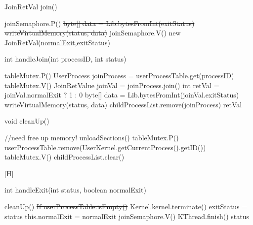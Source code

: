 \documentclass{article}
\begin{document}
\begin{spacing}{1.1}
\begin{algorithm}
  \label{alg:join}
  \caption{JoinRetVal \textsf{join}()}
  joinSemaphore.P()\;
  {\color{red}\sout{byte[] data = Lib.bytesFromInt(exitStatus)}\;
  \sout{writeVirtualMemory(status, data)}\;}
  joinSemaphore.V()\;
  {\color{red}\Return new JoinRetVal(normalExit,exitStatus)\;}
\end{algorithm}

\begin{algorithm}[H]
  \label{alg:handleJoin}
  \caption{int \textsf{handleJoin}(int processID, int status)}
  \colorbox{myyellow}{tableMutex.P()}\;
  UserProcess joinProcess = userProcessTable.get(processID)\;
  \colorbox{myyellow}{tableMutex.V()}\;
  {\color{red}
   {
  \;
   {
  \;
  }
  }
  JoinRetValue joinVal = joinProcess.join()\;
  int retVal = joinVal.normalExit ? 1 : 0\;
  byte[] data = Lib.bytesFromInt(joinVal.exitStatus)\;
  writeVirtualMemory(status, data)\; }
  childProcessList.remove(joinProcess)\;
  \Return retVal\;
\end{algorithm}

\begin{algorithm}
\label{alg:cleanUp}
\caption{void \textsf{cleanUp}()}
    \colorbox{myyellow}{//need free up memory!}\;
    unloadSections()\;
    \colorbox{myyellow}{tableMutex.P()}\;
    userProcessTable.remove(UserKernel.getCurrentProcess().getID())\;
    \colorbox{myyellow}{tableMutex.V()}\;
    childProcessList.clear()\;
\end{algorithm}

\begin{algorithm}
  \label{alg:handleExit}[H]
  \caption{int \textsf{handleExit}(int status, boolean normalExit)}
  \textsf{cleanUp}()\;
  {\color{red}\sout{If userProcessTable.isEmpty()} \;}
   {
    Kernel.kernel.terminate()\;
  }
  exitStatus = status\;
  this.normalExit = normalExit\;
  joinSemaphore.V()\;
  \colorbox{myyellow}{KThread.finish()}\;
  \Return status\;
\end{algorithm}

\end{spacing}
\end{document}
